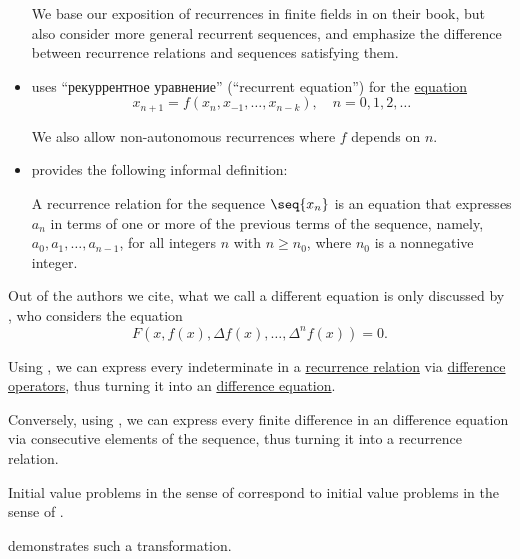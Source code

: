 \begin{remark}
\begin{itemize}
    We base our exposition of recurrences in finite fields in  on their book, but also consider more general recurrent sequences, and emphasize the difference between recurrence relations and sequences satisfying them.

    \item {} uses \enquote{рекуррентное уравнение} (\enquote{recurrent equation}) for the \hyperref[def:equation]{equation}
    \begin{equation*}
      x_{n+1} = f(x_n, x_{-1}, \ldots, x_{n-k}), \quad n = 0, 1, 2, \ldots
    \end{equation*}

    We also allow non-autonomous recurrences where \( f \) depends on \( n \).

    \item {} provides the following informal definition:
    \begin{displayquote}
      A recurrence relation for the sequence \( \seq{ x_n } \) is an equation that expresses \( a_n \) in terms of one or more of the previous terms of the sequence, namely, \( a_0, a_1, \ldots, a_{n-1} \), for all integers \( n \) with \( n \geq n_0 \), where \( n_0 \) is a nonnegative integer.
    \end{displayquote}
  \end{itemize}

  Out of the authors we cite, what we call a different equation is only discussed by , who considers the equation
  \begin{equation*}
    F(x, f(x), \Delta f(x), \ldots, \Delta^n f(x)) = 0.
  \end{equation*}
\end{remark}

\begin{proposition}\label{thm:recurrence_relations_and_difference_equations}
  Using , we can express every indeterminate in a \hyperref[def:recurrence_relation]{recurrence relation} via \hyperref[def:finite_difference_operator]{difference operators}, thus turning it into an \hyperref[def:difference_equation]{difference equation}.

  Conversely, using , we can express every finite difference in an difference equation via consecutive elements of the sequence, thus turning it into a recurrence relation.
\end{proposition}
\begin{comments}
  \item Initial value problems in the sense of  correspond to initial value problems in the sense of .

  \item {} demonstrates such a transformation.
\end{comments}

